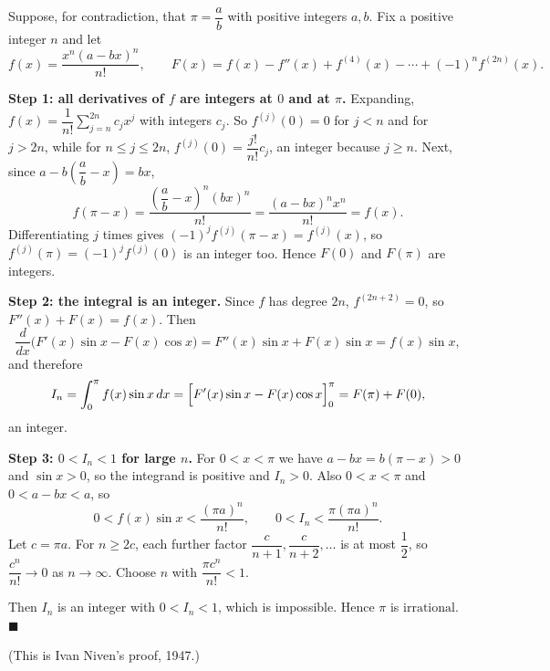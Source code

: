 Suppose, for contradiction, that $\pi=\dfrac ab$ with positive integers $a,b$. Fix a positive integer $n$ and let
\[f(x)=\dfrac{x^n(a-bx)^n}{n!},\qquad F(x)=f(x)-f''(x)+f^{(4)}(x)-\cdots+(-1)^nf^{(2n)}(x).\]

\textbf{Step 1: all derivatives of $f$ are integers at $0$ and at $\pi$.} Expanding, $f(x)=\dfrac{1}{n!}\sum_{j=n}^{2n}c_jx^j$ with integers $c_j$. So $f^{(j)}(0)=0$ for $j<n$ and for $j>2n$, while for $n\le j\le2n$, $f^{(j)}(0)=\dfrac{j!}{n!}c_j$, an integer because $j\ge n$. Next, since $a-b\left(\dfrac ab-x\right)=bx$,
\[f(\pi-x)=\dfrac{\left(\dfrac ab-x\right)^n(bx)^n}{n!}=\dfrac{(a-bx)^nx^n}{n!}=f(x).\]
Differentiating $j$ times gives $(-1)^jf^{(j)}(\pi-x)=f^{(j)}(x)$, so $f^{(j)}(\pi)=(-1)^jf^{(j)}(0)$ is an integer too. Hence $F(0)$ and $F(\pi)$ are integers.

\textbf{Step 2: the integral is an integer.} Since $f$ has degree $2n$, $f^{(2n+2)}=0$, so $F''(x)+F(x)=f(x)$. Then
\[\dfrac{d}{dx}\bigl(F'(x)\sin x-F(x)\cos x\bigr)=F''(x)\sin x+F(x)\sin x=f(x)\sin x,\]
and therefore
\[I_n=\int_0^\pi f(x)\sin x\,dx=\Bigl[F'(x)\sin x-F(x)\cos x\Bigr]_0^\pi=F(\pi)+F(0),\]
an integer.

\textbf{Step 3: $0<I_n<1$ for large $n$.} For $0<x<\pi$ we have $a-bx=b(\pi-x)>0$ and $\sin x>0$, so the integrand is positive and $I_n>0$. Also $0<x<\pi$ and $0<a-bx<a$, so
\[0<f(x)\sin x<\dfrac{(\pi a)^n}{n!},\qquad 0<I_n<\dfrac{\pi(\pi a)^n}{n!}.\]
Let $c=\pi a$. For $n\ge2c$, each further factor $\dfrac{c}{n+1},\dfrac{c}{n+2},\dots$ is at most $\dfrac12$, so $\dfrac{c^n}{n!}\to0$ as $n\to\infty$. Choose $n$ with $\dfrac{\pi c^n}{n!}<1$.

Then $I_n$ is an integer with $0<I_n<1$, which is impossible. Hence $\pi$ is $\boxed{\text{irrational}}$. $\blacksquare$

(This is Ivan Niven's proof, 1947.)
